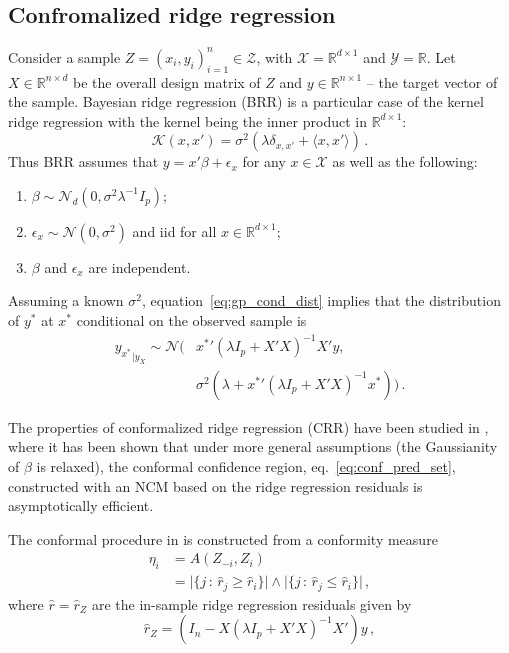 \documentclass[a4paper,14pt]{extarticle}
\newcommand{\Ncal}{\mathcal{N}}
\newcommand{\Kcal}{\mathcal{K}}
\newcommand{\Xcal}{\mathcal{X}}
\newcommand{\Ycal}{\mathcal{Y}}
\newcommand{\Zcal}{\mathcal{Z}}
\newcommand{\Real}{\mathbb{R}}
\begin{document}
\subsection{Confromalized ridge regression} %
\label{sub:conformalized_ridge_regression}

Consider a sample $Z = (x_i, y_i)_{i=1}^n \in \Zcal$, with $\Xcal = \Real^{d\times 1}$
and $\Ycal=\Real$. Let $X\in\Real^{n\times d}$ be the overall design matrix of $Z$
and $y\in\Real^{n\times1}$ -- the target vector of the sample. Bayesian ridge regression
(BRR) is a particular case of the kernel ridge regression with the kernel being
the inner product in $\Real^{d\times1}$:
\begin{equation*}
  \Kcal(x,x') = \sigma^2(\lambda \delta_{x,x'} + \langle x,x'\rangle) \,.
\end{equation*}
Thus BRR assumes that $y = x'\beta + \epsilon_x$ for any $x\in\Xcal$ as well as
the following:
\begin{enumerate}
  \item $\beta\sim\Ncal_d(0, \sigma^2 \lambda^{-1} I_p)$;
  \item $\epsilon_x\sim \Ncal(0, \sigma^2)$ and iid for all $x\in \Real^{d\times 1}$;
  \item $\beta$ and $\epsilon_x$ are independent.
\end{enumerate}
Assuming a known $\sigma^2$, equation~\ref{eq:gp_cond_dist} implies that the distribution
of $y^*$ at $x^*$ conditional on the observed sample is
\begin{align} \label{eq:brr_cond_dist}
  {y_{x^*}}_{|y_X}
    \sim \Ncal\bigl(&{x^*}'(\lambda I_p + X'X)^{-1}X'y, \nonumber\\
      &\sigma^2 (\lambda + {x^*}' (\lambda I_p + X'X)^{-1} x^* ) \bigr)
    \,.
\end{align}

The properties of conformalized ridge regression (CRR) have been studied in \cite{burnaevV14},
where it has been shown that under more general assumptions (the Gaussianity of $\beta$
is relaxed), the conformal confidence region, eq.~\ref{eq:conf_pred_set}, constructed
with an NCM based on the ridge regression residuals is asymptotically efficient.

The conformal procedure in \cite{burnaevV14} is constructed from a conformity measure
\begin{align} \label{eq:crr_ncm}
  \eta_i &= A(Z_{-i}, Z_i) \nonumber \\
    &= \bigl\lvert\{j\,:\, \hat{r}_j \geq \hat{r}_i \} \bigr\rvert \wedge
       \bigl\lvert\{j\,:\, \hat{r}_j \leq \hat{r}_i \} \bigr\rvert \,,
\end{align}
where $\hat{r} = \hat{r}_Z$ are the in-sample ridge regression residuals given by
\begin{equation} \label{eq:rr_insample_resid}
  \hat{r}_Z = (I_n - X (\lambda I_p + X'X)^{-1} X') y \,,
\end{equation}
\end{document}
